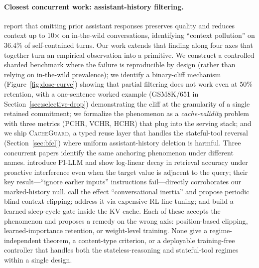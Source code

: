 \documentclass{article}
\begin{document}
\paragraph{Closest concurrent work: assistant-history filtering.}
\citet{huang2026benefit} report that omitting prior assistant responses preserves quality and reduces context up to 10$\times$ on in-the-wild conversations, identifying ``context pollution'' on 36.4\% of self-contained turns. Our work extends that finding along four axes that together turn an empirical observation into a primitive. We construct a controlled sharded benchmark where the failure is reproducible by design (rather than relying on in-the-wild prevalence); we identify a binary-cliff mechanism (Figure~\ref{fig:dose-curve}) showing that partial filtering does not work even at 50\% retention, with a one-sentence worked example (GSM8K/651 in Section~\ref{sec:selective-drop}) demonstrating the cliff at the granularity of a single retained commitment; we formalize the phenomenon as a \emph{cache-validity} problem with three metrics (PCHR, VCHR, HCHR) that plug into the serving stack; and we ship \textsc{CacheGuard}, a typed reuse layer that handles the stateful-tool reversal (Section~\ref{sec:bfcl}) where uniform assistant-history deletion is harmful. Three concurrent papers identify the same anchoring phenomenon under different names. \citet{wang2025proactive} introduce PI-LLM and show log-linear decay in retrieval accuracy under proactive interference even when the target value is adjacent to the query; their key result---``ignore earlier inputs'' instructions fail---directly corroborates our marked-history null. \citet{li2026inertia} call the effect ``conversational inertia'' and propose periodic blind context clipping; \citet{zhang2026rlanchor} address it via expensive RL fine-tuning; and \citet{xu2026sleepgate} build a learned sleep-cycle gate inside the KV cache. Each of these accepts the phenomenon and proposes a remedy on the wrong axis: position-based clipping, learned-importance retention, or weight-level training. None give a regime-independent theorem, a content-type criterion, or a deployable training-free controller that handles both the stateless-reasoning and stateful-tool regimes within a single design.
\end{document}

